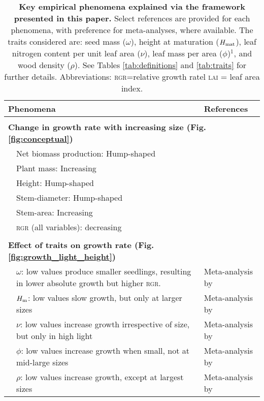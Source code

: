 \documentclass[a4paper,11pt]{article}
\begin{document}
\begin{table}[ht]
\caption{\textbf{Key empirical phenomena explained via the framework presented in this paper.}
Select references are provided for each phenomena, with preference for meta-analyses, where available. The traits considered are: seed mass ($\omega$), height at maturation ($H_{{\rm mat}}$), leaf nitrogen content per unit leaf area ($\nu$), leaf mass per area ($\phi$)$^1$, and wood density ($\rho$). See Tables \ref{tab:definitions} and \ref{tab:traits} for further details. Abbreviations: \textsc{rgr}=relative growth ratel \textsc{lai} = leaf area index.
}
{\footnotesize
{\centering
  \begin{tabular}{p{0.1cm}p{9cm}p{6cm}}
  \\
  \hline
  \multicolumn{2}{l}{ Phenomena} & References \\
  \hline
  \\
  \multicolumn{3}{l}{\bf{Change in growth rate with increasing size} (Fig. \ref{fig:conceptual})}\\
  & Net biomass production: Hump-shaped & \citet{Givnish-1988, Koch-2004} \\
  & Plant mass: Increasing & \citet{Sillett-2010, Stephenson-2014} \\
  & Height: Hump-shaped &  \citet{Ryan-2006, Sillett-2010, King-2011} \\
  & Stem-diameter: Hump-shaped &  \citet{Herault-2011} \\
  & Stem-area: Increasing & \citet{Sillett-2010} \\
  & \textsc{rgr} (all variables): decreasing & \citet{Rees-2010, Iida-2014}\\
  \\
  \multicolumn{3}{l}{\bf{Effect of traits on growth rate} (Fig. \ref{fig:growth_light_height})}\\
  & $\omega$: low values produce smaller seedlings, resulting in lower absolute growth but higher \textsc{rgr}. & Meta-analysis by \citet{Gibert-2016} \\
  & $H_{\rm m}$: low values slow growth, but only at larger sizes & Meta-analysis by \citet{Gibert-2016}\\
  & $\nu$: low values increase growth irrespective of size, but only in high light & Meta-analysis by \citet{Gibert-2016}\\
  & $\phi$: low values increase growth when small, not at mid-large sizes & Meta-analysis by \citet{Gibert-2016}\\
  & $\rho$: low values increase growth, except at largest sizes & Meta-analysis by \citet{Gibert-2016}\\


\end{tabular}}}
\end{table}
\end{document}
